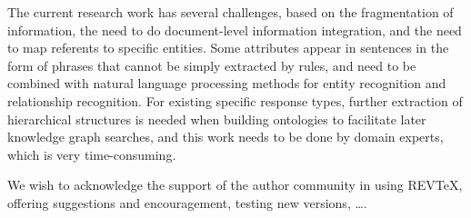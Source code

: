 \documentclass[%
 aip,
 jmp,%
 amsmath,amssymb,
 reprint,%
]{revtex4-2}
\begin{document}
The current research work has several challenges, based on the fragmentation of information, the need to do document-level information 
integration, and the need to map referents to specific entities. Some attributes appear in sentences in the form of phrases that cannot 
be simply extracted by rules, and need to be combined with natural language processing methods for entity recognition and relationship 
recognition. For existing specific response types, further extraction of hierarchical structures is needed when building ontologies to 
facilitate later knowledge graph searches, and this work needs to be done by domain experts, which is very time-consuming.

\begin{acknowledgments}
We wish to acknowledge the support of the author community in using
REV\TeX{}, offering suggestions and encouragement, testing new versions,
\dots.
\end{acknowledgments}

\nocite{*}
\end{document}
